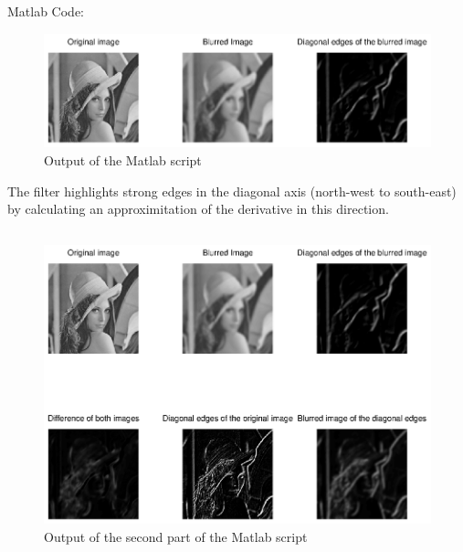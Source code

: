 \documentclass[DIN, pagenumber=false, fontsize=11pt, parskip=half]{scrartcl}
\begin{document}
    \subsection{}
    Matlab Code:
                  
    \begin{figure}[H]
        \centering
        \includegraphics[trim = {0 13cm 27cm 0}, clip,width=\textwidth]{lenaEdge1.eps}
        \caption{Output of the Matlab script}
    \end{figure}
    The filter highlights strong edges in the diagonal axis (north-west to south-east) by calculating
    an approximitation of the derivative in this direction.

    \subsection{}
                  
    \begin{figure}[H]
        \centering
        \includegraphics[trim = {0 10cm 27cm 0}, clip,width=\textwidth]{lenaEdge2.eps}
        \caption{Output of the second part of the Matlab script}
    \end{figure}
\end{document}
